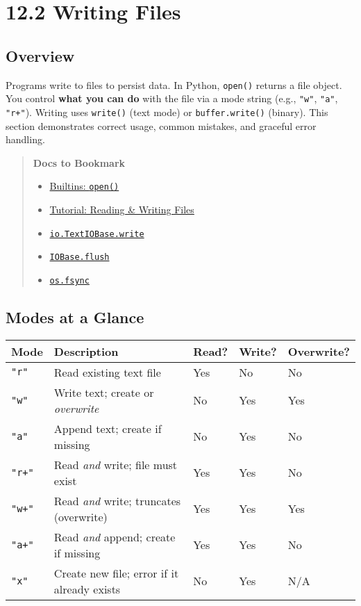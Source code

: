 \chapter{12.2 Writing Files}

\section*{Overview}
Programs write to files to persist data. In Python, \texttt{open()} returns a file object. 
You control \textbf{what you can do} with the file via a mode string (e.g., \texttt{"w"}, \texttt{"a"}, \texttt{"r+"}). 
Writing uses \texttt{write()} (text mode) or \texttt{buffer.write()} (binary). 
This section demonstrates correct usage, common mistakes, and graceful error handling.

\begin{quote}
\textbf{Docs to Bookmark}
\begin{itemize}
  \item \href{https://docs.python.org/3/library/functions.html#open}{Builtins: \texttt{open()}}
  \item \href{https://docs.python.org/3/tutorial/inputoutput.html#reading-and-writing-files}{Tutorial: Reading \& Writing Files}
  \item \href{https://docs.python.org/3/library/io.html#io.TextIOBase.write}{\texttt{io.TextIOBase.write}}
  \item \href{https://docs.python.org/3/library/io.html#io.IOBase.flush}{\texttt{IOBase.flush}}
  \item \href{https://docs.python.org/3/library/os.html#os.fsync}{\texttt{os.fsync}}
\end{itemize}
\end{quote}

\section{Modes at a Glance}
\begin{tabular}{l l l l l}
\textbf{Mode} & \textbf{Description} & \textbf{Read?} & \textbf{Write?} & \textbf{Overwrite?} \\
\hline
\texttt{"r"}   & Read existing text file                        & Yes & No  & No \\
\texttt{"w"}   & Write text; create or \emph{overwrite}         & No  & Yes & Yes \\
\texttt{"a"}   & Append text; create if missing                 & No  & Yes & No  \\
\texttt{"r+"}  & Read \emph{and} write; file must exist         & Yes & Yes & No  \\
\texttt{"w+"}  & Read \emph{and} write; truncates (overwrite)   & Yes & Yes & Yes \\
\texttt{"a+"}  & Read \emph{and} append; create if missing      & Yes & Yes & No  \\
\texttt{"x"}   & Create new file; error if it already exists    & No  & Yes & N/A \\
\end{tabular}

